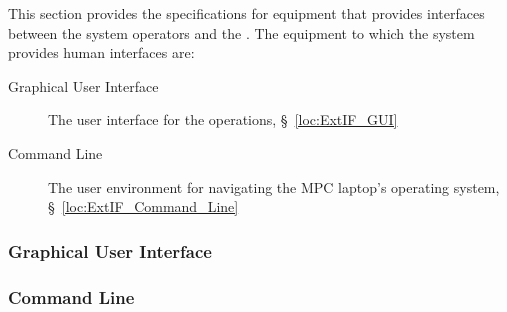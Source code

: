 This section provides the specifications for equipment that provides interfaces between the system operators and the \ThisSys.
The equipment to which the system provides human interfaces are:
\begin{description}
	\item[Graphical User Interface] The user interface for the \ThisSys operations, \S~\ref{loc:ExtIF_GUI}
	\item[Command Line] The user environment for navigating the MPC laptop's operating system, \S~\ref{loc:ExtIF_Command_Line}
\end{description}


\KNEADSUBSUBSECTIONNEWPAGE
\subsubsection{Graphical User Interface}
\label{loc:ExtIF_GUI}



\KNEADSUBSUBSECTIONNEWPAGE
\subsubsection{Command Line}
\label{loc:ExtIF_Command_Line}

